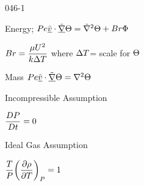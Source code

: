 \begin{mitframe}{046-1}
\begin{listone}
\begin{listtwo}
\begin{listthree}
                            \item Energy; $\p\e\uline{\tilde{\vvel}}\cdot\tilde{\gradop}\dimltemp=\tilde{\nabla}^2\dimltemp+\brinkman\pot$
                            			\begin{listfour}
                                        \item $\brinkman=\dfrac{\chempot\uvel^2}{\thermcond\iipf\Temp}$ where $\iipf\Temp$= scale for $\dimltemp$
                                        \end{listfour}
                           \item Mass $\peclet\uline{\tilde{\vvel}}\cdot\tilde{\gradop}\dimltemp=\nabla^2\dimltemp$
                           \item Incompressible Assumption
                           				\begin{listfour}
                                        		\item $\dfrac{\elecdisplace\p}{\elecdisplace{t}}=0$
                                        \end{listfour}
                           		\item Ideal Gas Assumption
                                		\begin{listfour}
                                        		\item $\dfrac{\Temp}{\p}\bigg(\dfrac{\partial\dens}{\partial\Temp}\bigg)_{\p}=1$
                                                
                                        \end{listfour}
                           \end{listthree}
                \end{listtwo}
\end{listone}


\end{mitframe}